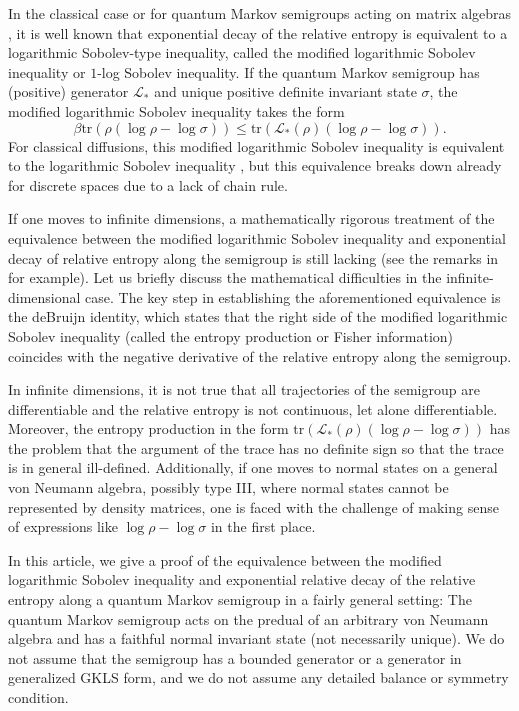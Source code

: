 \documentclass[12pt,a4paper]{amsart}
\newcommand{\1}{\mathds{1}}
\renewcommand{\L}{\mathcal L}
\theoremstyle{plain}
\theoremstyle{definition}
\theoremstyle{remark}
\begin{document}
In the classical case \cite{BT03} or for quantum Markov semigroups acting on matrix algebras \cite{KT13,CM15}, it is well known that exponential decay of the relative entropy is equivalent to a logarithmic Sobolev-type inequality, called the modified logarithmic Sobolev inequality or $1$-log Sobolev inequality. If the quantum Markov semigroup has (positive) generator $\mathcal L_\ast$ and unique positive definite invariant state $\sigma$, the modified logarithmic Sobolev inequality takes the form
\begin{equation*}
    \beta \mathrm{tr}(\rho(\log\rho-\log\sigma))\leq \mathrm{tr}(\mathcal L_\ast(\rho)(\log\rho-\log \sigma)).
\end{equation*}
For classical diffusions, this modified logarithmic Sobolev inequality is equivalent to the logarithmic Sobolev inequality \cite{Gro75}, but this equivalence breaks down already for discrete spaces due to a lack of chain rule.

If one moves to infinite dimensions, a mathematically rigorous treatment of the equivalence between the modified logarithmic Sobolev inequality and exponential decay of relative entropy along the semigroup is still lacking (see the remarks in \cite[Section 3.2]{HKV17} for example). Let us briefly discuss the mathematical difficulties in the infinite-dimensional case. The key step in establishing the aforementioned equivalence is the deBruijn identity, which states that the right side of the modified logarithmic Sobolev inequality (called the entropy production or Fisher information) coincides with the negative derivative of the relative entropy along the semigroup.

In infinite dimensions, it is not true that all trajectories of the semigroup are differentiable and the relative entropy is not continuous, let alone differentiable. Moreover, the entropy production in the form $\mathrm{tr}(\L_\ast(\rho)(\log\rho-\log\sigma))$ has the problem that the argument of the trace has no definite sign so that the trace is in general ill-defined. Additionally, if one moves to normal states on a general von Neumann algebra, possibly type III, where normal states cannot be represented by density matrices, one is faced with the challenge of making sense of expressions like $\log\rho-\log\sigma$ in the first place.

In this article, we give a proof of the equivalence between the modified logarithmic Sobolev inequality and exponential relative decay of the relative entropy along a quantum Markov semigroup in a fairly general setting: The quantum Markov semigroup acts on the predual of an arbitrary von Neumann algebra and has a faithful normal invariant state (not necessarily unique). We do not assume that the semigroup has a bounded generator or a generator in generalized GKLS form, and we do not assume any detailed balance or symmetry condition.
\end{document}
